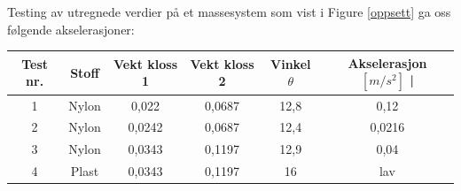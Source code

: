 \documentclass[10pt,a4paper]{report}
\begin{document}
Testing av utregnede verdier på et massesystem som vist i Figure \ref{oppsett} ga oss følgende akselerasjoner:

\begin{center}
  \begin{tabular}{| c | c | c | c | c  | c |}
    \hline
    Test nr. & Stoff & Vekt kloss 1 & Vekt kloss 2 & Vinkel $\theta$ & Akselerasjon $[m/s^2]$ | \\ \hline
    1 & Nylon & 0,022 & 0,0687 & 12,8 & 0,12 \\ \hline
    2 & Nylon & 0,0242  & 0,0687 & 12,4 & 0,0216 \\ \hline
    3 & Nylon & 0,0343 & 0,1197 & 12,9 & 0,04 \\ \hline
    4 & Plast & 0,0343 & 0,1197 & 16 & lav  \\ \hline
  \end{tabular}
\end{center}
\end{document}
